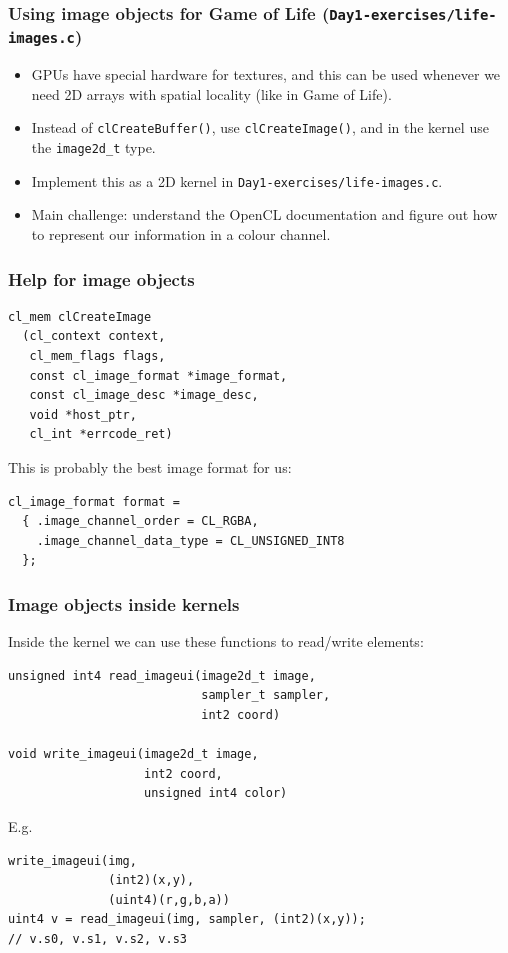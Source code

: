 \documentclass{beamer}
\begin{document}
\begin{frame}
  \frametitle{Using image objects for Game of Life (\texttt{Day1-exercises/life-images.c})}

  \begin{itemize}
  \item GPUs have special hardware for textures, and this can be used
    whenever we need 2D arrays with spatial locality (like in Game of
    Life).

  \item Instead of \texttt{clCreateBuffer()}, use
    \texttt{clCreateImage()}, and in the kernel use the
    \texttt{image2d\_t} type.

  \item Implement this as a 2D kernel in
    \texttt{Day1-exercises/life-images.c}.

  \item Main challenge: understand the OpenCL documentation and figure
    out how to represent our information in a colour channel.
  \end{itemize}
\end{frame}

\begin{frame}
  \frametitle{Help for image objects}

\begin{lstlisting}[backgroundcolor=\color{lightgray}]
cl_mem clCreateImage
  (cl_context context,
   cl_mem_flags flags,
   const cl_image_format *image_format,
   const cl_image_desc *image_desc,
   void *host_ptr,
   cl_int *errcode_ret)
\end{lstlisting}

  This is probably the best image format for us:

\begin{lstlisting}
cl_image_format format =
  { .image_channel_order = CL_RGBA,
    .image_channel_data_type = CL_UNSIGNED_INT8
  };
\end{lstlisting}

\end{frame}

\begin{frame}[fragile]
  \frametitle{Image objects inside kernels}

Inside the kernel we can use these functions to read/write elements:

\begin{lstlisting}
unsigned int4 read_imageui(image2d_t image,
                           sampler_t sampler,
                           int2 coord)

void write_imageui(image2d_t image,
                   int2 coord,
                   unsigned int4 color)
\end{lstlisting}

E.g.

\begin{lstlisting}
write_imageui(img,
              (int2)(x,y),
              (uint4)(r,g,b,a))
uint4 v = read_imageui(img, sampler, (int2)(x,y));
// v.s0, v.s1, v.s2, v.s3
\end{lstlisting}

\end{frame}
\end{document}
